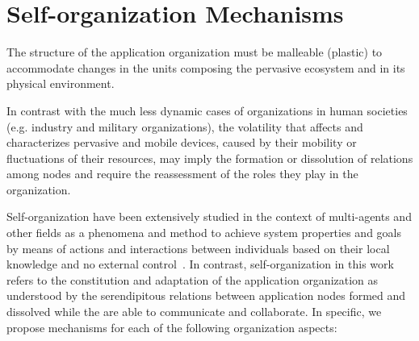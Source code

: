 \section{Self-organization Mechanisms}\label{sec:self_organization}




The structure of the application organization
must be malleable (plastic) to accommodate changes in the units composing the pervasive ecosystem and in its physical environment. 

In contrast with the much less dynamic cases of organizations in human societies (e.g. industry and military organizations), the volatility that affects and characterizes pervasive and mobile devices, caused by their mobility or fluctuations of their resources, may imply the formation or dissolution of relations among nodes and require the reassessment of the roles they play in the organization.

Self-organization have been extensively studied in the context of multi-agents and other fields as a phenomena and method to achieve system properties and goals by means of actions and interactions between individuals based on their local knowledge and no external control~\cite{DiMarzoSerugendo:2005, Banzhaf:2009}. In contrast, self-organization in this work refers to the constitution and adaptation of the application organization as understood by the serendipitous relations between application nodes formed and dissolved while the are able to communicate and collaborate. In specific, we propose mechanisms for each of the following organization aspects:


